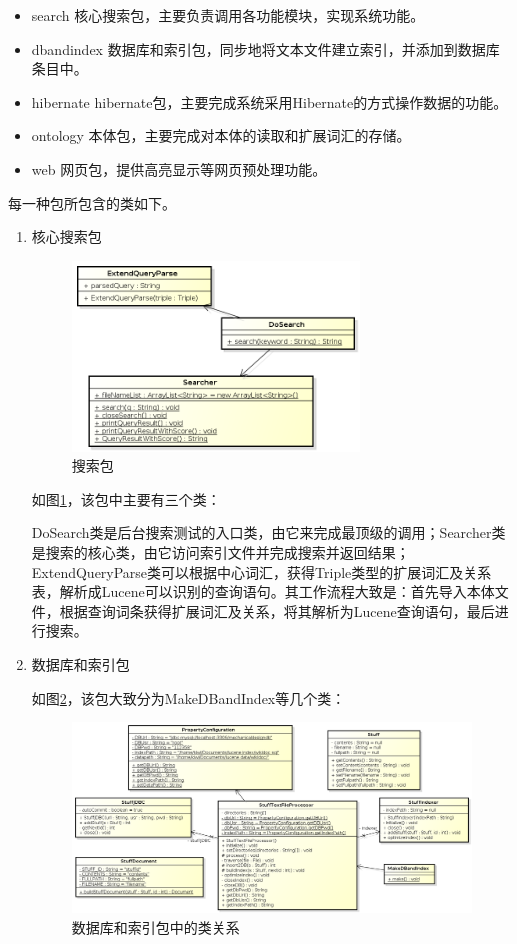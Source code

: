 \documentclass[12pt,a4paper]{article}
\newcommand{\wuhao}{\fontsize{10.5pt}{\baselineskip}\selectfont}
\begin{document}
	\begin{itemize}
	\item{\Times search} 
	核心搜索包，主要负责调用各功能模块，实现系统功能。
	\item{\Times dbandindex} 
	数据库和索引包，同步地将文本文件建立索引，并添加到数据库条目中。
	\item{\Times hibernate} 
	{\Times hibernate}包，主要完成系统采用{\Times Hibernate}的方式操作数据的功能。
	\item{\Times ontology} 
	本体包，主要完成对本体的读取和扩展词汇的存储。
	\item{\Times web} 
	网页包，提供高亮显示等网页预处理功能。	
	\end{itemize}
	
	每一种包所包含的类如下。
	
	\begin{enumerate}[(1)]
	\item 核心搜索包
	
	\begin{figure}[htbp] 
	\centering\includegraphics[width=3in]{fig/SearchPackage.png} 
	\caption{\wuhao 搜索包}\label{fig:搜索包}
	\end{figure}
	
	如图\ref{fig:搜索包}，该包中主要有三个类：
	
	{\Times DoSearch}类是后台搜索测试的入口类，由它来完成最顶级的调用；{\Times Searcher}类是搜索的核心类，由它访问索引文件并完成搜索并返回结果；{\Times ExtendQueryParse}类可以根据中心词汇，获得{\Times Triple}类型的扩展词汇及关系表，解析成{\Times Lucene}可以识别的查询语句。其工作流程大致是：首先导入本体文件，根据查询词条获得扩展词汇及关系，将其解析为{\Times Lucene}查询语句，最后进行搜索。
	
	\item 数据库和索引包
	
	如图\ref{fig:数据库和索引包}，该包大致分为{\Times MakeDBandIndex}等几个类：
	\begin{figure}[htbp] 
	\centering\includegraphics[width=5in]{fig/dbandindexpackage.png} 
	\caption{\wuhao 数据库和索引包中的类关系}\label{fig:数据库和索引包}
	\end{figure}
	

\end{enumerate}
\end{document}
